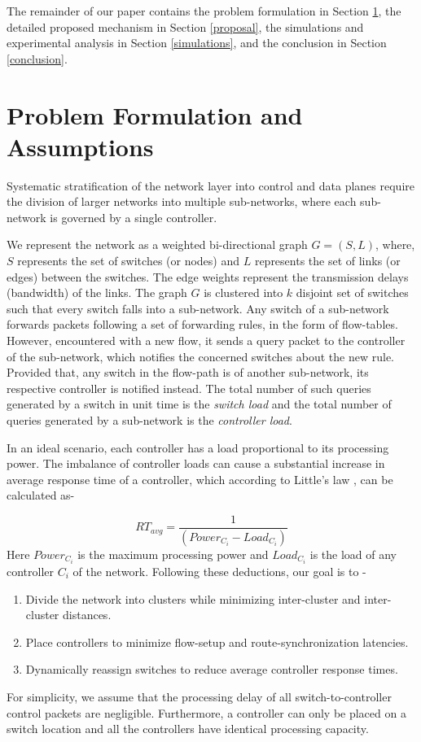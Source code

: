 \documentclass[preprint,12pt]{elsarticle}
\begin{document}
	The remainder of our paper contains the problem formulation in Section \ref{sysMod}, the detailed proposed mechanism in Section \ref{proposal}, the simulations and experimental analysis in Section \ref{simulations}, and the conclusion in Section \ref{conclusion}.
	
	\section{Problem Formulation and Assumptions} \label{sysMod}
	Systematic stratification of the network layer into control and data planes require the division of larger networks into multiple sub-networks, where each sub-network is governed by a single controller.
	
	We represent the network as a weighted bi-directional graph $G=(S,L)$, where, $S$ represents the set of switches (or nodes) and $L$ represents the set of links (or edges) between the switches. The edge weights represent the transmission delays (bandwidth) of the links. The graph $G$ is clustered into $k$ disjoint set of switches such that every switch falls into a sub-network. Any switch of a sub-network forwards packets following a set of forwarding rules, in the form of flow-tables. However, encountered with a new flow, it sends a query packet to the controller of the sub-network, which notifies the concerned switches about the new rule. Provided that, any switch in the flow-path is of another sub-network, its respective controller is notified instead. The total number of such queries generated by a switch in unit time is the \textit{switch load} and the total number of queries generated by a sub-network is the \textit{controller load}.
	
	In an ideal scenario, each controller has a load proportional to its processing power. The imbalance of controller loads can cause a substantial increase in average response time of a controller, which according to Little's law \cite{wang2016dynamic}, can be calculated as-
	
	\begin{equation} \label{eqn:cresponse}
		RT_{avg} = \frac{1}{(Power_{C_i} - Load_{C_i})}
	\end{equation}
	Here $Power_{C_i}$ is the maximum processing power and $Load_{C_i}$ is the load of any controller $C_i$ of the network. Following these deductions, our goal is to -
	\begin{enumerate}
		\item Divide the network into clusters while minimizing inter-cluster and inter-cluster distances.
		\item Place controllers to minimize flow-setup and route-synchronization latencies.
		\item Dynamically reassign switches to reduce average controller response times.
	\end{enumerate}
	For simplicity, we assume that the processing delay of all switch-to-controller control packets are negligible. Furthermore, a controller can only be placed on a switch location and all the controllers have identical processing capacity.
	
\end{document}
